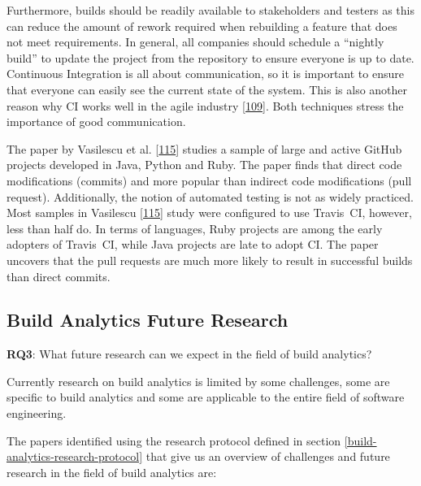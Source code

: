 \documentclass[]{book}
\begin{document}
Furthermore, builds should be readily available to stakeholders and
testers as this can reduce the amount of rework required when rebuilding
a feature that does not meet requirements. In general, all companies
should schedule a ``nightly build'' to update the project from the
repository to ensure everyone is up to date. Continuous Integration is
all about communication, so it is important to ensure that everyone can
easily see the current state of the system. This is also another reason
why CI works well in the agile industry
{[}\protect\hyperlink{ref-stolberg2009enabling}{109}{]}. Both techniques
stress the importance of good communication.

The paper by Vasilescu et al.
{[}\protect\hyperlink{ref-vasilescu2014continuous}{115}{]} studies a
sample of large and active GitHub projects developed in Java, Python and
Ruby. The paper finds that direct code modifications (commits) and more
popular than indirect code modifications (pull request). Additionally,
the notion of automated testing is not as widely practiced. Most samples
in Vasilescu {[}\protect\hyperlink{ref-vasilescu2014continuous}{115}{]}
study were configured to use Travis~CI, however, less than half do. In
terms of languages, Ruby projects are among the early adopters of
Travis~CI, while Java projects are late to adopt CI. The paper uncovers
that the pull requests are much more likely to result in successful
builds than direct commits.

\subsection{Build Analytics Future
Research}\label{build-analytics-future-research}

\textbf{RQ3}: What future research can we expect in the field of build
analytics?

Currently research on build analytics is limited by some challenges,
some are specific to build analytics and some are applicable to the
entire field of software engineering.

The papers identified using the research protocol defined in section
\ref{build-analytics-research-protocol} that give us an overview of
challenges and future research in the field of build analytics are:
\end{document}

